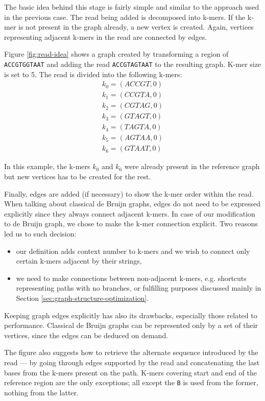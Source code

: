 The basic idea behind this stage is fairly simple and similar to the approach used in the previous case. The read being added is decomposed into k-mers. If the k-mer is not present in the graph already, a new vertex is created. Again, vertices representing adjacent k-mers in the read are connected by edges. 

Figure \ref{fig:read-idea} shows a graph created by transforming a region of \texttt{ACCGTGGTAAT} and adding the read \texttt{ACCGTAGTAAT} to the resulting graph. K-mer size is set to 5. The read is divided into the following k-mers:
\begin{align*}
k_0 = (ACCGT, 0) \\
k_1 = (CCGTA, 0) \\
k_2 = (CGTAG, 0) \\
k_3 = (GTAGT, 0) \\
k_4 = (TAGTA, 0) \\
k_5 = (AGTAA, 0) \\
k_6 = (GTAAT, 0)
\end{align*}

In this example, the k-mers $k_0$ and $k_6$ were already present in the reference graph but new vertices has to be created for the rest.

Finally, edges are added (if necessary) to show the k-mer order within the read. When talking about classical de Bruijn graphs, edges do not need to be expressed explicitly since they always connect adjacent k-mers. In case of our modification to de Bruijn graph, we chose to make the k-mer connection explicit. Two reasons led us to such decision:
\begin{itemize}
\item our definition adds context number to k-mers and we wish to connect only certain k-mers adjacent by their strings,
\item we need to make connections between non-adjacent k-mers, e.g. shortcuts representing paths with no branches, or fulfilling purposes discussed mainly in Section \ref{sec:graph-structure-optimization}.
\end{itemize}
Keeping graph edges explicitly has also its drawbacks, especially those related to performance. Classical de Bruijn graphs can be represented only by a set of their vertices, since the edges can be deduced on demand.

The figure also suggests how to retrieve the alternate sequence introduced by the read --- by going through edges supported by the read and concatenating the last bases from the k-mers present on the path. K-mers covering start and end of the reference region are the only exceptions; all except the \texttt{B} is used from the former, nothing from the latter.

